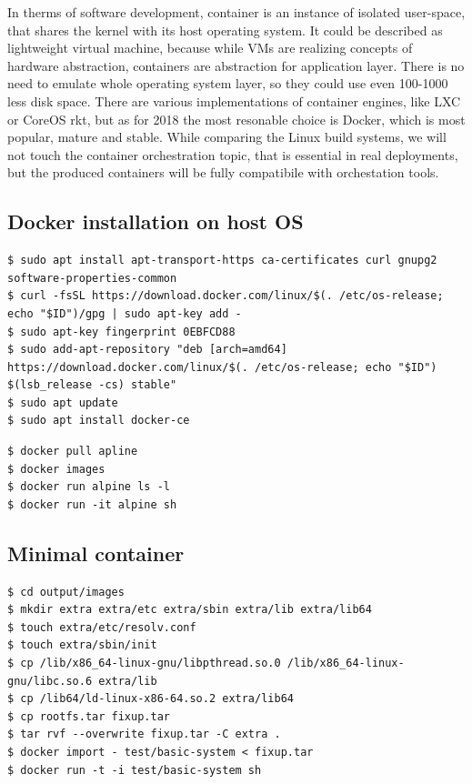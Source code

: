 \documentclass[printmode]{mgr}
\begin{document}

In therms of software development, container is an instance of isolated user-space, that shares the kernel with its host operating system.\cite{web:what-container}
It could be described as lightweight virtual machine, because while VMs are realizing concepts of hardware abstraction, containers are abstraction for application layer.
There is no need to emulate whole operating system layer, so they could use even 100-1000 less disk space.
There are various implementations of container engines, like LXC or CoreOS rkt, but as for 2018 the most resonable choice is Docker, which is most popular, mature and stable.\cite{web:why-docker}
While comparing the Linux build systems, we will not touch the container orchestration topic, that is essential in real deployments\cite{web:container-orchestration}, but the produced containers will be fully compatibile with orchestation tools.

\subsection*{Docker installation on host OS}

\begin{lstlisting}
$ sudo apt install apt-transport-https ca-certificates curl gnupg2 software-properties-common
$ curl -fsSL https://download.docker.com/linux/$(. /etc/os-release; echo "$ID")/gpg | sudo apt-key add -
$ sudo apt-key fingerprint 0EBFCD88
$ sudo add-apt-repository "deb [arch=amd64] https://download.docker.com/linux/$(. /etc/os-release; echo "$ID") $(lsb_release -cs) stable"
$ sudo apt update
$ sudo apt install docker-ce
\end{lstlisting}


\begin{lstlisting}
$ docker pull apline
$ docker images
$ docker run alpine ls -l
$ docker run -it alpine sh
\end{lstlisting}

\subsection*{Minimal container}

\begin{lstlisting}
$ cd output/images
$ mkdir extra extra/etc extra/sbin extra/lib extra/lib64
$ touch extra/etc/resolv.conf
$ touch extra/sbin/init
$ cp /lib/x86_64-linux-gnu/libpthread.so.0 /lib/x86_64-linux-gnu/libc.so.6 extra/lib
$ cp /lib64/ld-linux-x86-64.so.2 extra/lib64
$ cp rootfs.tar fixup.tar
$ tar rvf --overwrite fixup.tar -C extra .
$ docker import - test/basic-system < fixup.tar
$ docker run -t -i test/basic-system sh
\end{lstlisting}
\end{document}
